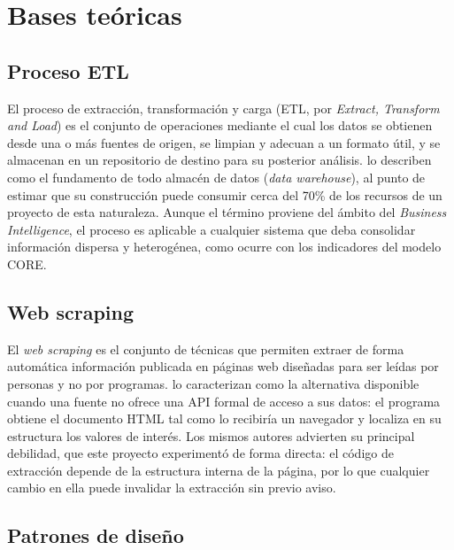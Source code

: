 \documentclass[12pt,letterpaper,oneside]{report}
\begin{document}
\section{Bases te\'oricas}
\label{sec:bases-teoricas}

\subsection{Proceso ETL}
\label{sec:bases-etl}

El proceso de extracci\'on, transformaci\'on y carga (ETL, por \textit{Extract, Transform and Load}) es el conjunto de operaciones mediante el cual los datos se obtienen desde una o m\'as fuentes de origen, se limpian y adecuan a un formato \'util, y se almacenan en un repositorio de destino para su posterior an\'alisis. \textcite{kimball2004} lo describen como el fundamento de todo almac\'en de datos (\textit{data warehouse}), al punto de estimar que su construcci\'on puede consumir cerca del 70\% de los recursos de un proyecto de esta naturaleza. Aunque el t\'ermino proviene del \'ambito del \textit{Business Intelligence}, el proceso es aplicable a cualquier sistema que deba consolidar informaci\'on dispersa y heterog\'enea, como ocurre con los indicadores del modelo CORE.

\subsection{Web scraping}
\label{sec:bases-scraping}

El \textit{web scraping} es el conjunto de t\'ecnicas que permiten extraer de forma autom\'atica informaci\'on publicada en p\'aginas web dise\~nadas para ser le\'idas por personas y no por programas. \textcite{glezpena2014} lo caracterizan como la alternativa disponible cuando una fuente no ofrece una API formal de acceso a sus datos: el programa obtiene el documento HTML tal como lo recibir\'ia un navegador y localiza en su estructura los valores de inter\'es. Los mismos autores advierten su principal debilidad, que este proyecto experiment\'o de forma directa: el c\'odigo de extracci\'on depende de la estructura interna de la p\'agina, por lo que cualquier cambio en ella puede invalidar la extracci\'on sin previo aviso.

\subsection{Patrones de dise\~no}
\label{sec:bases-patrones}
\end{document}
